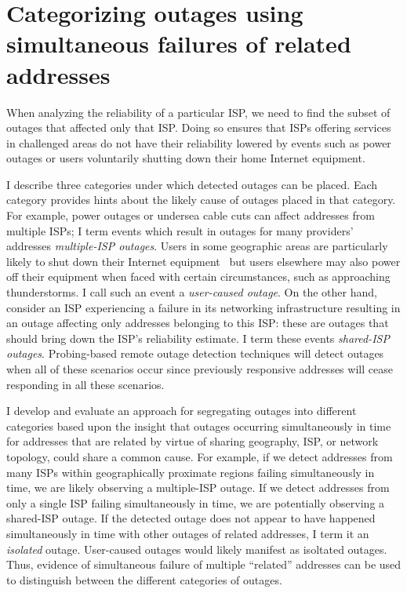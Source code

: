 
\section{Categorizing outages using simultaneous failures of related addresses}
\label{sec:last_mile}



When analyzing the reliability of a particular ISP, we need
to find the subset of outages that affected only
that ISP. Doing so ensures that ISPs offering services in challenged
areas do not have their reliability lowered by events such as power
outages or users voluntarily shutting down their home Internet
equipment.

I describe three categories under which detected outages can be 
placed. Each category provides hints about the likely cause of outages
placed in that category. For example, power outages or undersea cable cuts can affect addresses from multiple
ISPs; I term events which result in outages for
many providers' addresses \emph{multiple-ISP outages}. Users in some
geographic areas are particularly likely to shut down their Internet
equipment~\cite{grover2013peeking} but users elsewhere may also power
off their equipment when faced with certain circumstances, such as
approaching thunderstorms. I call such an event a \emph{user-caused
outage}. On the other hand, consider an ISP experiencing a failure in
its networking infrastructure resulting in an outage affecting only
addresses belonging to this ISP: these are outages that should bring down the ISP's reliability
estimate. I term these events \emph{shared-ISP outages}.
Probing-based remote outage detection techniques will detect outages
when all of these scenarios occur since previously responsive
addresses will cease responding in all these scenarios.

I develop and evaluate an approach for segregating outages into different categories
based upon the insight that outages occurring simultaneously in time
for addresses that are related by virtue of sharing geography, ISP, or
network topology,
could share a common cause. For example, if we detect addresses from
many ISPs within geographically proximate regions failing simultaneously in time, we are likely observing a
multiple-ISP outage. If we detect addresses from only a single ISP
failing simultaneously in time, we are potentially observing a
shared-ISP outage. If the detected outage does not appear to
have happened simultaneously in time with other outages of related
addresses, I term it an \emph{isolated} outage. User-caused outages would
likely manifest as isoltated outages. Thus, evidence
of simultaneous failure of multiple
``related'' addresses can be used to distinguish between the different
categories of outages. 

